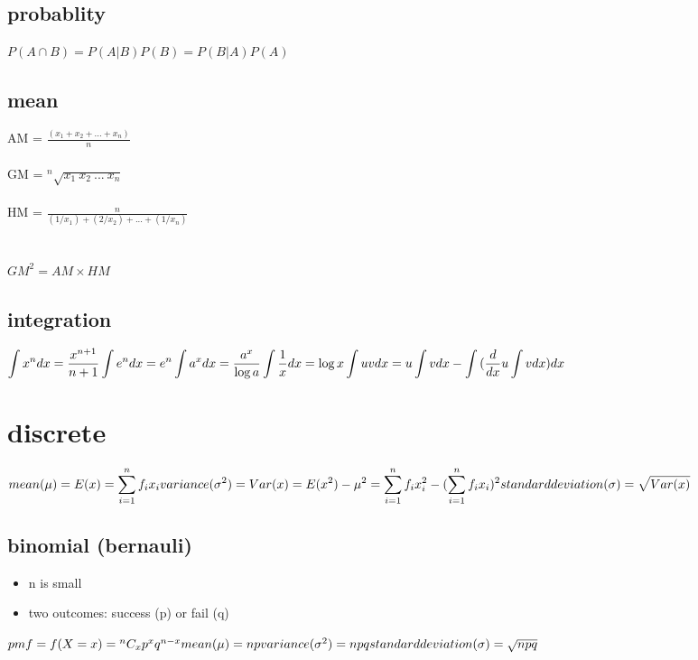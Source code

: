 \documentclass[12pt]{article}
\newcommand*{\C}[2]{{}^{#1}C_{#2}}%
\begin{document}
\subsection{probablity}
$P(A \cap B) = P(A|B) P(B) = P(B|A) P(A)$

\subsection{mean}
AM = $\displaystyle \frac{(x_1 + x_2 + ... + x_n)}{n}$ \\ \\
GM = $\displaystyle {}^n\sqrt{x_1\ x_2\ ...\ x_n}$ \\ \\
HM = $\displaystyle \frac{n}{(1/x_1)+(2/x_2)+...+(1/x_n)}$ \\ \\ \\
$GM^2 = AM \times HM$

\subsection{integration}
$\displaystyle
\int{x^ndx} = \frac{x^{n+1}}{n+1} \\
\int{e^ndx} = e^n \\
\int{a^xdx} = \frac{a^x}{\log{a}} \\
\int{\frac{1}{x}dx} = \log{x} \\
\int{uvdx} = u\int{vdx} - \int{(\frac{d}{dx}u \int{vdx})dx} \\
$
\newpage

\section{discrete}
$\displaystyle
mean (\mu)
= E(x)
= \sum_{i=1}^n{f_ix_i} \\
variance (\sigma^2)
= Var(x)
= E(x^2) - \mu^2
= \sum_{i=1}^n{f_ix_i^2} - (\sum_{i=1}^n{f_ix_i})^2  \\
standard deviation (\sigma)
= \sqrt{Var(x)}
$

\subsection{binomial (bernauli)}
\begin{itemize}
  \item n is small
  \item two outcomes: success (p) or fail (q)
\end{itemize}
$
pmf = f(X=x) = \C{n}{x} p^x q^{n-x} \\ \\
mean (\mu) = np \\
variance (\sigma^2) = npq \\
standard deviation (\sigma) = \sqrt{npq}
$
\end{document}
